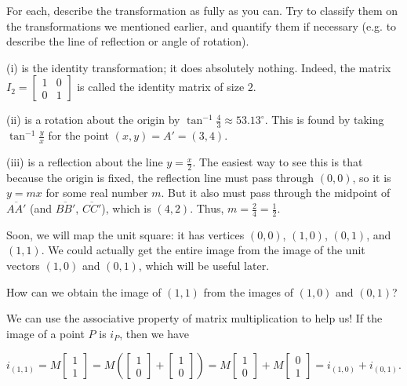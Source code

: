 \documentclass[../key.tex]{subfiles}
\begin{document}
\begin{inner_problem}
\item For each, describe the transformation as fully as you can. Try to classify them on the transformations we mentioned earlier, and quantify them if necessary (e.g. to describe the line of reflection or angle of rotation).
\end{inner_problem}

(i) is the identity transformation; it does absolutely nothing. Indeed, the matrix $I_2=\begin{bmatrix} 1 & 0 \\ 0 & 1 \end{bmatrix}$ is called the identity matrix of size $2$.

(ii) is a rotation about the origin by $\tan^{-1} \frac{4}{3} \approx 53.13^\circ$. This is found by taking $\tan^{-1} \frac{y}{x}$ for the point $(x,y)=A'=(3,4)$.

(iii) is a reflection about the line $y = \frac{x}{2}$. The easiest way to see this is that because the origin is fixed, the reflection line must pass through $(0,0)$, so it is $y =mx$ for some real number $m$. But it also must pass through the midpoint of $\overline{AA'}$ (and $\overline{BB'}$, $\overline{CC'}$), which is $(4,2)$. Thus, $m=\frac{2}{4}=\frac{1}{2}$.

\begin{outer_problem}
\item Soon, we will map the unit square: it has vertices $(0,0)$, $(1,0)$, $(0,1)$, and $(1,1)$. We could actually get the entire image from the image of the unit vectors $(1,0)$ and $(0,1)$, which will be useful later.
\end{outer_problem}

\begin{inner_problem}[start=1]
\item How can we obtain the image of $(1,1)$ from the images of $(1,0)$ and $(0,1)$?
\end{inner_problem}

We can use the associative property of matrix multiplication to help us! If the image of a point $P$ is $i_P$, then we have

$$i_(1,1) = M\begin{bmatrix} 1 \\ 1 \end{bmatrix} = M\left(\begin{bmatrix} 1 \\ 0 \end{bmatrix} + \begin{bmatrix} 1 \\ 0 \end{bmatrix}\right) = M\begin{bmatrix} 1 \\ 0 \end{bmatrix} + M\begin{bmatrix} 0 \\ 1 \end{bmatrix} = i_{(1,0)} + i_{(0,1)}.$$
\end{document}
